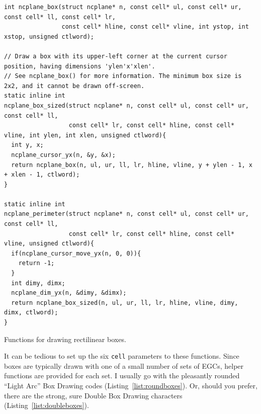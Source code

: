 \documentclass[letterpaper,10pt]{article}
\begin{document}
\begin{listing}[!htb]
\begin{verbatim}
int ncplane_box(struct ncplane* n, const cell* ul, const cell* ur, const cell* ll, const cell* lr,
                const cell* hline, const cell* vline, int ystop, int xstop, unsigned ctlword);

// Draw a box with its upper-left corner at the current cursor position, having dimensions 'ylen'x'xlen'.
// See ncplane_box() for more information. The minimum box size is 2x2, and it cannot be drawn off-screen.
static inline int
ncplane_box_sized(struct ncplane* n, const cell* ul, const cell* ur, const cell* ll,
                  const cell* lr, const cell* hline, const cell* vline, int ylen, int xlen, unsigned ctlword){
  int y, x;
  ncplane_cursor_yx(n, &y, &x);
  return ncplane_box(n, ul, ur, ll, lr, hline, vline, y + ylen - 1, x + xlen - 1, ctlword);
}

static inline int
ncplane_perimeter(struct ncplane* n, const cell* ul, const cell* ur, const cell* ll,
                  const cell* lr, const cell* hline, const cell* vline, unsigned ctlword){
  if(ncplane_cursor_move_yx(n, 0, 0)){
    return -1;
  }
  int dimy, dimx;
  ncplane_dim_yx(n, &dimy, &dimx);
  return ncplane_box_sized(n, ul, ur, ll, lr, hline, vline, dimy, dimx, ctlword);
}
\end{verbatim}
\caption{Functions for drawing rectilinear boxes.}
\label{list:boxes}
\end{listing}

It can be tedious to set up the six \texttt{cell} parameters to these
functions. Since boxes are typically drawn with one of a small number of sets
of EGCs, helper functions are provided for each set. I usually go with the
pleasantly rounded ``Light Arc'' Box Drawing codes
(Listing~\ref{list:roundboxes}). Or, should you prefer, there are
the strong, sure Double Box Drawing characters
(Listing~\ref{list:doubleboxes}).
\end{document}
